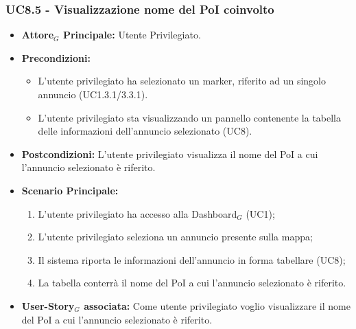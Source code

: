 \documentclass[11pt]{article}
\begin{document}
\begin{justify}
 \subsubsection{\textbf{UC8.5 - Visualizzazione nome del PoI coinvolto}}
 \begin{itemize}
     \item \textbf{Attore$_G$ Principale:} Utente Privilegiato.
     \item \textbf{Precondizioni:}
       \begin{itemize}
    	        \item L'utente privilegiato ha selezionato un marker, riferito ad un singolo annuncio (UC1.3.1/3.3.1).
          \item L'utente privilegiato sta visualizzando un pannello contenente la tabella delle informazioni dell'annuncio selezionato (UC8).
       \end{itemize}
     \item \textbf{Postcondizioni:} L'utente privilegiato visualizza il nome del PoI a cui l'annuncio selezionato è riferito.
     \item \textbf{Scenario Principale:}
        \begin{enumerate}
            \item L'utente privilegiato ha accesso alla Dashboard$_G$ (UC1);
            \item L'utente privilegiato seleziona un annuncio presente sulla mappa;
            \item Il sistema riporta le informazioni dell'annuncio in forma tabellare (UC8);
            \item La tabella conterrà il nome del PoI a cui l'annuncio selezionato è riferito.
        \end{enumerate}
     \item \textbf{User-Story$_G$ associata:} Come utente privilegiato voglio visualizzare il nome del PoI a cui l'annuncio selezionato è riferito. 
 \end{itemize}

\end{justify}
\end{document}
